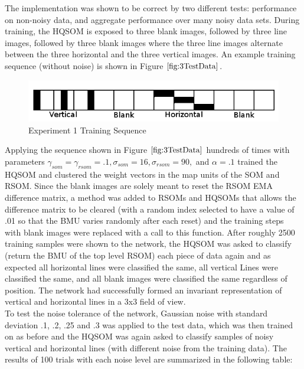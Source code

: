 \documentclass[a4paper,10pt]{article}
\begin{document}
The implementation was shown to be correct by two different tests: performance on non-noisy
data, and aggregate performance over many noisy data sets. During training, the HQSOM is exposed to
three blank images, followed by three line images, followed by three blank images where the three
line images alternate between the three horizontal and the three vertical images. An example
training sequence (without noise) is shown in Figure $\ref{fig:3TestData}$.
\begin{figure}[ht]
\begin{center} 
 \includegraphics[scale=.3]{./exp1_dataset.png}
\end{center} 
\caption{Experiment 1 Training Sequence}
\label{fig:3TestData}
\end{figure} 
Applying the sequence shown in Figure $\ref{fig:3TestData}$ hundreds of times with parameters
$\gamma_{som} = \gamma_{rsom} = .1, \sigma_{som}=16, \sigma_{rsom}=90,$ and $ \alpha = .1$
trained the HQSOM and clustered the weight vectors in the map units of the SOM and RSOM. Since the
blank images are solely meant to reset the RSOM EMA difference matrix, a method was added to RSOMs
and HQSOMs that allows the difference matrix to be cleared (with a random index selected to have a
value of .01 so that the BMU varies randomly after each reset) and the training steps with blank
images were replaced with a call to this function. After roughly 2500 training samples were shown to
the network, the HQSOM was asked to classify (return the BMU of the top level RSOM) each piece of
data again and as expected all horizontal lines were classified the same, all vertical Lines were
classified the same, and all blank images were classified the same regardless of position.  The
network had successfully formed an invariant representation of vertical and horizontal lines in a
3x3 field of view.
\\
To test the noise tolerance of the network, Gaussian noise with standard deviation .1, .2, .25 and
.3 was applied to the test data, which was then trained on as before and the HQSOM was again asked
to classify samples of noisy vertical and horizontal lines (with different noise from the training
data).  The results of 100 trials with each noise level are summarized in the following table:
\end{document}
